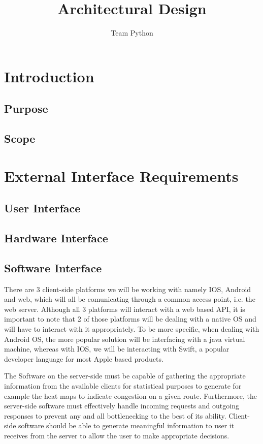 \documentclass[11pt]{article}
\author{Team Python}
\title{Architectural Design}
\begin{document}
	\setlength{\parskip}{6pt}
	
	\tableofcontents
	\newpage
	
	\section{Introduction}
    \subsection{Purpose}
	\subsection{Scope}
	
	\section{External Interface Requirements}
	\subsection{User Interface}
	\subsection{Hardware Interface}
	\subsection{Software Interface}
	There are 3 client-side platforms we will be working with namely IOS, Android and web, which will all be comunicating through a common access point, i.e. the web server.  Although all 3 platforms will interact with a web based API, it is important to note that 2 of those platforms will be dealing with a native OS and will have to interact with it appropriately.  To be more specific, when dealing with Android OS, the more popular solution will be interfacing with a java virtual machine, whereas with IOS, we will be interacting with Swift, a popular developer language for most Apple based products.  
	
	The Software on the server-side must be capable of gathering the appropriate information from the available clients for statistical purposes to generate for example the heat maps to indicate congestion on a given route.  Furthermore, the server-side software must effectively handle incoming requests and outgoing responses to prevent any and all bottlenecking to the best of its ability.  Client-side software should be able to generate meaningful information to user it receives from the server to allow the user to make appropriate decisions.  
\end{document}
